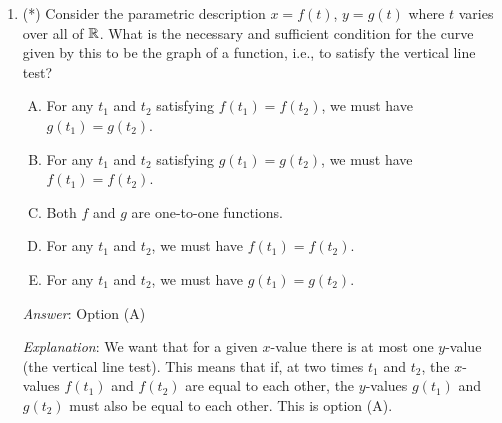\documentclass[10pt]{amsart}
\begin{document}
\begin{enumerate}
  \begin{enumerate}[(A)]
  \item $x = t^3$, $y = t^5$, for $t \in \R$
  \item $x = t^5$, $y = t^3$, for $t \in \R$
  \item $x = t$, $y = t^{3/5}$, for $t \in \R$
  \item $x = t^{5/3}$, $y = t$, for $t \in \R$
  \item All of the above parametric descriptions work
  \end{enumerate}

  {\em Answer}: Option (A)

  {\em Explanation}: The exponents are at the wrong places -- if $x =
  t^3$, then $x^3 = t^9$ and if $y = t^5$, then $y^5 = t^{25}$ --
  these are certainly not equal.

  {\em Performance review}: $24$ out of $26$ got this. $2$ chose (D).

  {\em Historical note (last time)}: $16$ people got this correct. $4$ chose
  (E), $3$ chose (B), $1$ chose (C).

\item (*) Consider the parametric description $x = f(t)$, $y = g(t)$
  where $t$ varies over all of $\mathbb{R}$. What is the necessary and
  sufficient condition for the curve given by this to be the graph of
  a function, i.e., to satisfy the vertical line test?

  \begin{enumerate}[(A)]
  \item For any $t_1$ and $t_2$ satisfying $f(t_1) = f(t_2)$, we must
    have $g(t_1) = g(t_2)$.
  \item For any $t_1$ and $t_2$ satisfying $g(t_1) = g(t_2)$, we must
    have $f(t_1) = f(t_2)$.
  \item Both $f$ and $g$ are one-to-one functions.
  \item For any $t_1$ and $t_2$, we must have $f(t_1) = f(t_2)$.
  \item For any $t_1$ and $t_2$, we must have $g(t_1) = g(t_2)$.
  \end{enumerate}

  {\em Answer}: Option (A)

  {\em Explanation}: We want that for a given $x$-value there is at
  most one $y$-value (the vertical line test). This means that if, at
  two times $t_1$ and $t_2$, the $x$-values $f(t_1)$ and $f(t_2)$ are
  equal to each other, the $y$-values $g(t_1)$ and $g(t_2)$ must also
  be equal to each other. This is option (A).


\end{enumerate}
\end{document}
